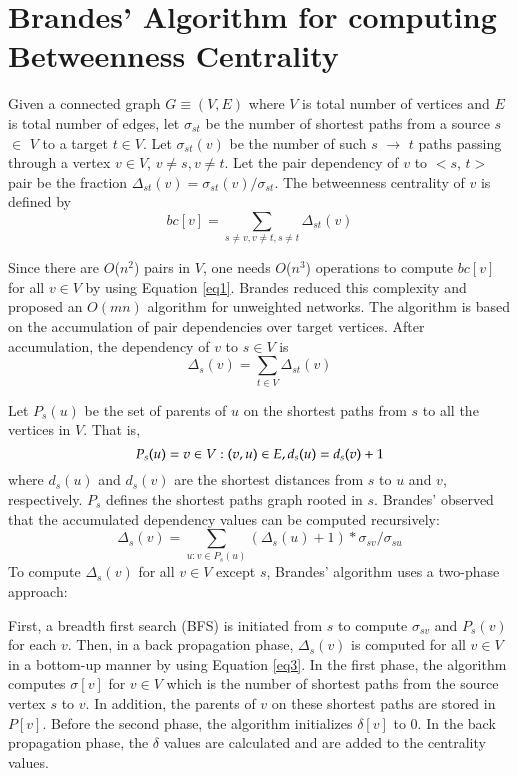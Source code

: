 
\chapter{Brandes' Algorithm for computing Betweenness Centrality}
\label{chap:lit}

Given a connected graph $G \equiv (V,E)$ where $V$ is total number of vertices and $E$ is total number of edges, let  $\sigma_{st}$  be the number of shortest paths from a source $s$ $\in$ $V$ to a target $t\in V$. Let $\sigma_{st} (v)$ be the number of such $s$ $\rightarrow$ $t$ paths passing through a vertex $v \in V $, $v \neq s,v \neq t$. Let the pair dependency of $v$ to $<s$, $t>$ pair be
the fraction $\Delta_{st}(v) =\sigma_{st}(v) / \sigma_{st}$. The betweenness centrality of $v$ is defined by
\begin{equation} \label{eq1}
bc[v]={\sum_{s \neq v,v \neq t,s \neq t}}  \Delta_{st}(v)   
\end{equation}

Since there are $O$($n^2$) pairs in $V$, one needs $O$($n^3$) operations to compute $bc[v]$ for all $v \in V$ by using Equation \ref{eq1}. Brandes reduced this complexity and proposed an $O(mn)$ algorithm for unweighted networks. The algorithm is based on the accumulation of pair dependencies over target vertices.
After accumulation, the dependency of $v$ to $s \in V$ is 
\vspace{-0.1em}
\begin{equation} \label{eq2}
\Delta_{s}(v) = {\sum_{t \in V}}\Delta_{st}(v)
\end{equation}

Let $P_{s}(u)$ be the set of parents of $u$ on the shortest paths from $s$ to all the vertices in $V$. That is,\[  P_{s}(u) = \\{v \in V : (v, u) \in E, d_{s}(u)=d_{s}(v)+ 1\\} \]
where $d_{s}(u)$ and $d_{s}(v)$ are the shortest distances from $s$ to $u$ and $v$, respectively.
$P_{s}$ defines the shortest paths graph rooted in $s$. Brandes' observed that the accumulated dependency values can be computed recursively:
\begin{equation} \label{eq3}
\Delta_{s}(v) = \sum_{u:v \in P_{s}(u)} (\Delta_{s}(u)+1)*\sigma_{sv}/\sigma_{su}
\end{equation}
To compute $\Delta_{s}(v)$ for all $v \in V$ except $s$, Brandes' algorithm uses a two-phase approach:

First, a breadth first search (BFS) is initiated from $s$ to compute $\sigma_{sv}$ and $P_{s}(v)$ for each $v$. Then, in a back propagation phase, $\Delta_{s}(v)$ is computed for all $v \in V$ in a bottom-up manner by using Equation \ref{eq3}.
In the first phase, the algorithm computes $\sigma[v]$ for $v \in V$ which is the number of shortest paths from the source vertex $s$ to $v$. In addition, the parents of $v$ on these shortest paths are stored in $P[v]$. Before the second phase, the algorithm initializes $\delta[v]$ to 0. 
In the back propagation phase, the $\delta$  values are calculated and are added to the centrality values.

